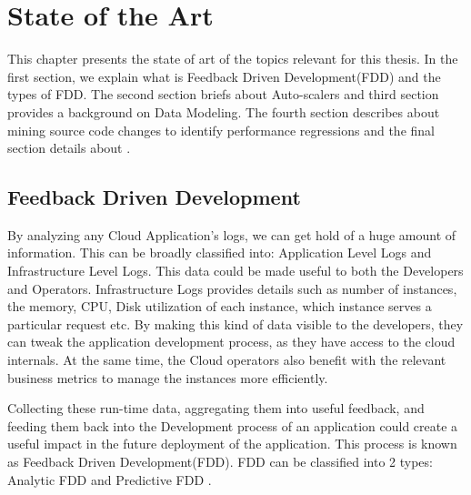\documentclass[article,type=msc,colorback,12pt,accentcolor=tud7b,table]{tudthesis}
\begin{document}

	\cleardoublepage

 \section{State of the Art}
 	
	This chapter presents the state of art of the topics relevant for this thesis. In the first section, we explain what is Feedback Driven Development(FDD) and the types of FDD. The second section briefs about Auto-scalers and third section provides a background on Data Modeling. The fourth section describes about mining source code changes to identify performance regressions and the final section details about . 
	
		\subsection{Feedback Driven Development } 		
		
		By analyzing any Cloud Application's logs, we can get hold of a huge amount of information. This can be broadly classified into: Application Level Logs and Infrastructure Level Logs. This data could be made useful to both the Developers and Operators. Infrastructure Logs provides details such as number of instances, the memory, CPU, Disk utilization of each instance, which instance serves a particular request etc. By making this kind of data visible to the developers, they can tweak the application development process, as they have access to the cloud internals. At the same time, the Cloud operators also benefit with the relevant business metrics to manage the instances more efficiently. 
		
		\par Collecting these run-time data, aggregating them into useful feedback, and feeding them back into the Development process of an application could create a useful impact in the future deployment of the application. This process is known as Feedback Driven Development(FDD). FDD can be classified into 2 types: Analytic FDD and Predictive FDD \cite{cito2015runtime}.
		
\end{document}
